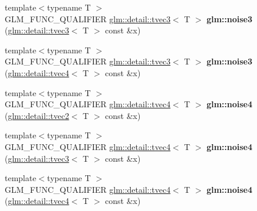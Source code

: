\begin{DoxyCompactItemize}
\item 
\hypertarget{namespaceglm_a40d0d9df93beb7d0c8b621a28ea59bd2}{{\footnotesize template$<$typename T $>$ }\\\-G\-L\-M\-\_\-\-F\-U\-N\-C\-\_\-\-Q\-U\-A\-L\-I\-F\-I\-E\-R \*
\hyperlink{structglm_1_1detail_1_1tvec3}{glm\-::detail\-::tvec3}$<$ \-T $>$ {\bfseries glm\-::noise3} (\hyperlink{structglm_1_1detail_1_1tvec3}{glm\-::detail\-::tvec3}$<$ \-T $>$ const \&x)}\label{namespaceglm_a40d0d9df93beb7d0c8b621a28ea59bd2}

\item 
\hypertarget{namespaceglm_a9119e91ca516dcbf0e4788cb13f6cf25}{{\footnotesize template$<$typename T $>$ }\\\-G\-L\-M\-\_\-\-F\-U\-N\-C\-\_\-\-Q\-U\-A\-L\-I\-F\-I\-E\-R \*
\hyperlink{structglm_1_1detail_1_1tvec3}{glm\-::detail\-::tvec3}$<$ \-T $>$ {\bfseries glm\-::noise3} (\hyperlink{structglm_1_1detail_1_1tvec4}{glm\-::detail\-::tvec4}$<$ \-T $>$ const \&x)}\label{namespaceglm_a9119e91ca516dcbf0e4788cb13f6cf25}

\item 
\hypertarget{namespaceglm_a5a9bee7392c533fb77629d57f30cddb9}{{\footnotesize template$<$typename T $>$ }\\\-G\-L\-M\-\_\-\-F\-U\-N\-C\-\_\-\-Q\-U\-A\-L\-I\-F\-I\-E\-R \*
\hyperlink{structglm_1_1detail_1_1tvec4}{glm\-::detail\-::tvec4}$<$ \-T $>$ {\bfseries glm\-::noise4} (\hyperlink{structglm_1_1detail_1_1tvec2}{glm\-::detail\-::tvec2}$<$ \-T $>$ const \&x)}\label{namespaceglm_a5a9bee7392c533fb77629d57f30cddb9}

\item 
\hypertarget{namespaceglm_a6ab9ad0230446bf1a440b9c93186586d}{{\footnotesize template$<$typename T $>$ }\\\-G\-L\-M\-\_\-\-F\-U\-N\-C\-\_\-\-Q\-U\-A\-L\-I\-F\-I\-E\-R \*
\hyperlink{structglm_1_1detail_1_1tvec4}{glm\-::detail\-::tvec4}$<$ \-T $>$ {\bfseries glm\-::noise4} (\hyperlink{structglm_1_1detail_1_1tvec3}{glm\-::detail\-::tvec3}$<$ \-T $>$ const \&x)}\label{namespaceglm_a6ab9ad0230446bf1a440b9c93186586d}

\item 
\hypertarget{namespaceglm_adcaee6089d990bbe782c20cea1ebe337}{{\footnotesize template$<$typename T $>$ }\\\-G\-L\-M\-\_\-\-F\-U\-N\-C\-\_\-\-Q\-U\-A\-L\-I\-F\-I\-E\-R \*
\hyperlink{structglm_1_1detail_1_1tvec4}{glm\-::detail\-::tvec4}$<$ \-T $>$ {\bfseries glm\-::noise4} (\hyperlink{structglm_1_1detail_1_1tvec4}{glm\-::detail\-::tvec4}$<$ \-T $>$ const \&x)}\label{namespaceglm_adcaee6089d990bbe782c20cea1ebe337}

\end{DoxyCompactItemize}


